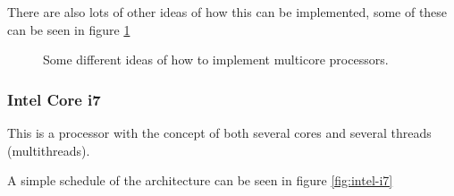 There are also lots of other ideas of how this can be implemented, some of these can be seen in figure \ref{fig:multi-core-ideas}

\begin{figure}[H]
  \centering
  \caption{Some different ideas of how to implement multicore processors.}
  \label{fig:multi-core-ideas}
\end{figure}


\subsubsection{Intel Core i7}
This is a processor with the concept of both several cores and several threads (multithreads).

A simple schedule of the architecture can be seen in figure \ref{fig:intel-i7} 

